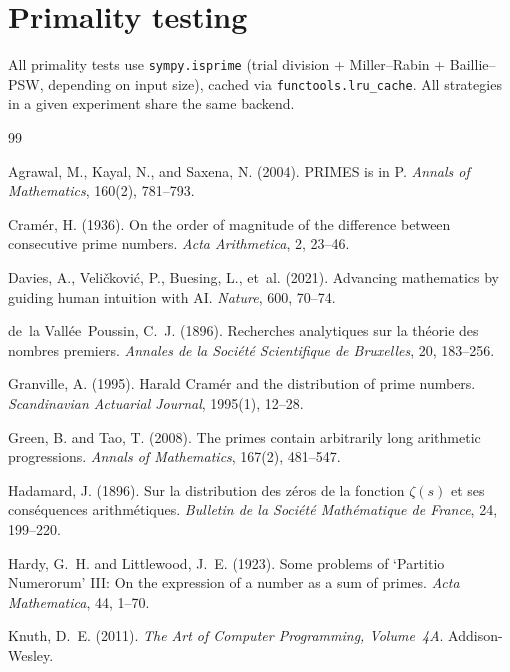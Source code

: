 \documentclass[12pt]{article}
\begin{document}
\section{Primality testing}
\label{app:primality}

All primality tests use \texttt{sympy.isprime}
(trial division + Miller--Rabin + Baillie--PSW, depending on input size),
cached via \texttt{functools.lru\_cache}.
All strategies in a given experiment share the same backend.

\begin{thebibliography}{99}

Agrawal, M., Kayal, N., and Saxena, N. (2004).
PRIMES is in P.
\emph{Annals of Mathematics}, 160(2), 781--793.

Cram\'er, H. (1936).
On the order of magnitude of the difference between consecutive prime numbers.
\emph{Acta Arithmetica}, 2, 23--46.

Davies, A., Veli\v{c}kovi\'c, P., Buesing, L., et~al. (2021).
Advancing mathematics by guiding human intuition with AI.
\emph{Nature}, 600, 70--74.

de~la Vall\'ee~Poussin, C.~J. (1896).
Recherches analytiques sur la th\'eorie des nombres premiers.
\emph{Annales de la Soci\'et\'e Scientifique de Bruxelles}, 20, 183--256.

Granville, A. (1995).
Harald Cram\'er and the distribution of prime numbers.
\emph{Scandinavian Actuarial Journal}, 1995(1), 12--28.

Green, B. and Tao, T. (2008).
The primes contain arbitrarily long arithmetic progressions.
\emph{Annals of Mathematics}, 167(2), 481--547.

Hadamard, J. (1896).
Sur la distribution des z\'eros de la fonction $\zeta(s)$ et ses
  cons\'equences arithm\'etiques.
\emph{Bulletin de la Soci\'et\'e Math\'ematique de France}, 24, 199--220.

Hardy, G.~H. and Littlewood, J.~E. (1923).
Some problems of `Partitio Numerorum' III: On the expression of a number
as a sum of primes.
\emph{Acta Mathematica}, 44, 1--70.

Knuth, D.~E. (2011).
\emph{The Art of Computer Programming, Volume~4A}.
Addison-Wesley.


\end{thebibliography}
\end{document}
